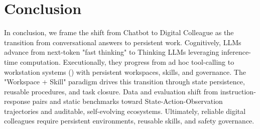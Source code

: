 \section{Conclusion}

In conclusion, we frame the shift from Chatbot to Digital Colleague as the transition from conversational answers to persistent work. Cognitively, LLMs advance from next-token "fast thinking" to Thinking LLMs leveraging inference-time computation. Executionally, they progress from ad hoc tool-calling to workstation systems (\method{}) with persistent workspaces, skills, and governance. The "Workspace + Skill" paradigm drives this transition through state persistence, reusable procedures, and task closure. Data and evaluation shift from instruction-response pairs and static benchmarks toward State-Action-Observation trajectories and auditable, self-evolving ecosystems. Ultimately, reliable digital colleagues require persistent environments, reusable skills, and safety governance.